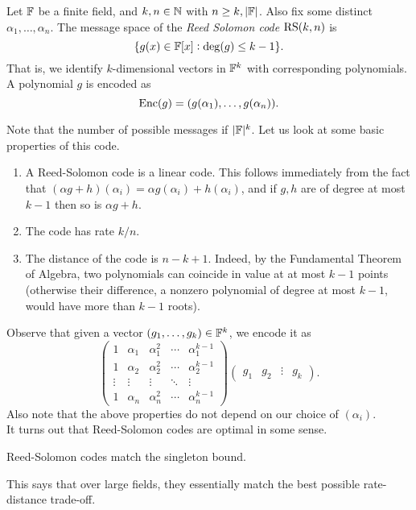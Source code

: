 			\begin{fdef}
				Let $\mathbb{F}$ be a finite field, and $k,n \in \mathbb{N}$ with $n \ge k,|\mathbb{F}|$. Also fix some distinct $\alpha_1,\ldots,\alpha_n$. The message space of the \emph{Reed Solomon code} $\operatorname{RS}(k,n)$ is
				\[ \{ g(x) \in \mathbb{F}[x] : \deg(g) \le k-1 \}. \]
				That is, we identify $k$-dimensional vectors in $\mathbb{F}^k$ with corresponding polynomials.
				A polynomial $g$ is encoded as
				\[ \operatorname{Enc}(g) = ( g(\alpha_1),\ldots,g(\alpha_n) ). \]
			\end{fdef}
			Note that the number of possible messages if $|\mathbb{F}|^k$. Let us look at some basic properties of this code.
			\begin{enumerate}
				\item A Reed-Solomon code is a linear code. This follows immediately from the fact that $(\alpha g+h)(\alpha_i) = \alpha g(\alpha_i) + h(\alpha_i)$, and if $g,h$ are of degree at most $k-1$ then so is $\alpha g + h$.
				\item The code has rate $k/n$.
				\item The distance of the code is $n-k+1$. Indeed, by the Fundamental Theorem of Algebra, two polynomials can coincide in value at at most $k-1$ points (otherwise their difference, a nonzero polynomial of degree at most $k-1$, would have more than $k-1$ roots).
			\end{enumerate}
			Observe that given a vector $(g_1,\ldots,g_k) \in \mathbb{F}^k$, we encode it as
			\[ \begin{pmatrix} 1 & \alpha_1 & \alpha_1^2 & \cdots & \alpha_1^{k-1} \\ 1 & \alpha_2 & \alpha_2^2 & \cdots & \alpha_2^{k-1} \\ \vdots & \vdots & \vdots & \ddots & \vdots \\ 1 & \alpha_n & \alpha_n^2 & \cdots & \alpha_n^{k-1} \end{pmatrix} \begin{pmatrix} g_1 & g_2 & \vdots & g_k \end{pmatrix}. \]
			Also note that the above properties do not depend on our choice of $(\alpha_i)$.\\

			It turns out that Reed-Solomon codes are optimal in some sense.
			\begin{ftheo}%
				Reed-Solomon codes match the singleton bound.
			\end{ftheo}
			This says that over large fields, they essentially match the best possible rate-distance trade-off.

